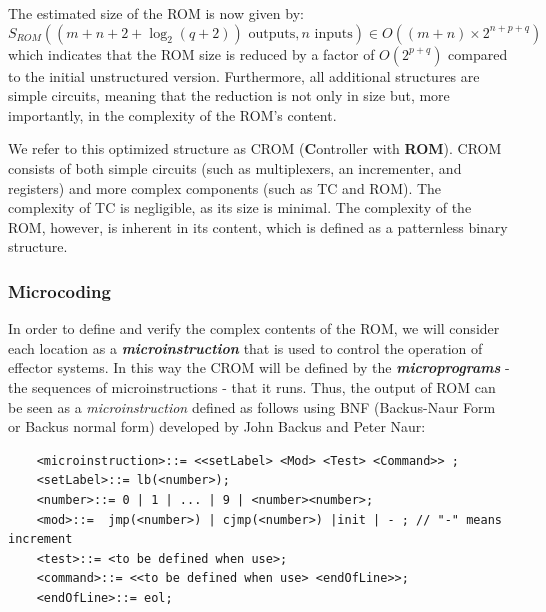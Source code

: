 The estimated size of the ROM is now given by:
\[
S_{ROM}((m+n+2+\log_2 (q+2)) \text{ outputs}, n \text{ inputs}) \in O((m+n) \times 2^{n+p+q})
\]
which indicates that the ROM size is reduced by a factor of 
$O(2^{p+q})$ compared to the initial unstructured version. Furthermore, 
all additional structures are simple circuits, meaning that the 
reduction is not only in size but, more importantly, in the complexity 
of the ROM’s content.

We refer to this optimized structure as CROM ({\bf C}ontroller with {\bf ROM}). 
CROM consists of both simple circuits (such as multiplexers, an incrementer, and registers) 
and more complex components (such as TC and ROM). The complexity of TC is negligible, 
as its size is minimal. The complexity of the ROM, however, is inherent in its content, 
which is defined as a patternless binary structure.

\subsubsection{Microcoding}

In order to define and verify the complex contents of the ROM, we will consider each location as a {\bf {\em microinstruction}} that is used to control the operation of effector systems. In this way the CROM will be defined by the {\bf {\em microprograms}} - the sequences of microinstructions - that it runs.
Thus, the output of ROM can be seen as a {\em microinstruction} defined
as follows using BNF (Backus-Naur Form or Backus normal form) developed by John Backus and Peter Naur: {\small
\begin{verbatim}
    <microinstruction>::= <<setLabel> <Mod> <Test> <Command>> ;
    <setLabel>::= lb(<number>);
    <number>::= 0 | 1 | ... | 9 | <number><number>;
    <mod>::=  jmp(<number>) | cjmp(<number>) |init | - ; // "-" means increment
    <test>::= <to be defined when use>;
    <command>::= <<to be defined when use> <endOfLine>>;
    <endOfLine>::= eol;
\end{verbatim}
}

